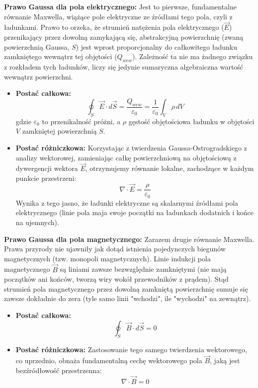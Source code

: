 \documentclass[11pt, a4paper]{article}
\begin{document}
\textbf{Prawo Gaussa dla pola elektrycznego:}
Jest to pierwsze, fundamentalne równanie Maxwella, wiążące pole elektryczne ze źródłami tego pola, czyli z ładunkami. Prawo to orzeka, że strumień natężenia pola elektrycznego ($\vec{E}$) przenikający przez dowolną zamykającą się, abstrakcyjną powierzchnię (zwaną powierzchnią Gaussa, $S$) jest wprost proporcjonalny do całkowitego ładunku zamkniętego wewnątrz tej objętości ($Q_{wew}$). Zależność ta nie ma żadnego związku z rozkładem tych ładunków, liczy się jedynie sumaryczna algebraiczna wartość wewnątrz powierzchni.
\begin{itemize}
    \item \textbf{Postać całkowa:}
    \[
    \oint_S \vec{E} \cdot d\vec{S} = \frac{Q_{wew}}{\varepsilon_0} = \frac{1}{\varepsilon_0} \int_V \rho \, dV
    \]
    gdzie $\varepsilon_0$ to przenikalność próżni, a $\rho$ gęstość objętościowa ładunku w objętości $V$ zamkniętej powierzchnią $S$.
    \item \textbf{Postać różniczkowa:}
    Korzystając z twierdzenia Gaussa-Ostrogradskiego z analizy wektorowej, zamieniając całkę powierzchniową na objętościową z dywergencji wektora $\vec{E}$, otrzymujemy równanie lokalne, zachodzące w każdym punkcie przestrzeni:
    \[
    \nabla \cdot \vec{E} = \frac{\rho}{\varepsilon_0}
    \]
    Wynika z tego jasno, że ładunki elektryczne są skalarnymi źródłami pola elektrycznego (linie pola maja swoje początki na ładunkach dodatnich i końce na ujemnych).
\end{itemize}

\textbf{Prawo Gaussa dla pola magnetycznego:}
Zarazem drugie równanie Maxwella. Prawa przyrody nie ujawniły jak dotąd istnienia pojedynczych biegunów magnetycznych (tzw. monopoli magnetycznych). Linie indukcji pola magnetycznego $\vec{B}$ są liniami zawsze bezwzględnie zamkniętymi (nie mają początków ani końców, tworzą wiry wokół przewodników z prądem). Stąd strumień pola magnetycznego przez dowolną zamkniętą powierzchnię sumuje się zawsze dokładnie do zera (tyle samo linii "wchodzi", ile "wychodzi" na zewnątrz).
\begin{itemize}
    \item \textbf{Postać całkowa:}
    \[
    \oint_S \vec{B} \cdot d\vec{S} = 0
    \]
    \item \textbf{Postać różniczkowa:}
    Zastosowanie tego samego twierdzenia wektorowego, co uprzednio, obnaża fundamentalną cechę wektorowego pola $\vec{B}$, jaką jest bezźródłowość przestrzenna:
    \[
    \nabla \cdot \vec{B} = 0
    \]
\end{itemize}
\end{document}
